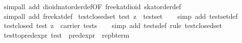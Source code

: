 \begin{isabellebody}
\ {}simp{}all\ add{}\ dioid{}nat{}order{}def{}OF\ free{}kat{}dioid{}\ skat{}order{}def{}\isanewline
\ \ \isamarkupfalse%
\ {}simp{}all\ add{}\ free{}kat{}def{}%
\endisatagproof
{\isafoldproof}%
%
\isadelimproof
\isanewline
%
\endisadelimproof
\isanewline
{}\isamarkupfalse%
\ test{}closed{}set{}\ {}test\ z\ {}\ test{}set{}\isanewline
%
\isadelimproof
\ \ %
\endisadelimproof
%
\isatagproof
{}\isamarkupfalse%
\ {}simp\ add{}\ test{}set{}def{}%
\endisatagproof
{\isafoldproof}%
%
\isadelimproof
\isanewline
%
\endisadelimproof
\isanewline
{}\isamarkupfalse%
\ test{}closed{}\ {}test\ z\ {}\ carrier\ tests{}\isanewline
%
\isadelimproof
\ \ %
\endisadelimproof
%
\isatagproof
{}\isamarkupfalse%
\ {}simp\ add{}\ tests{}def{}\ rule\ test{}closed{}set{}%
\endisatagproof
{\isafoldproof}%
%
\isadelimproof
\isanewline
%
\endisadelimproof
\isanewline
{}\isamarkupfalse%
\ test{}to{}pred{}expr{}\ {}test\ {}\ pred{}expr\ {}\ rep{}bterm{}\isanewline

\end{isabellebody}

